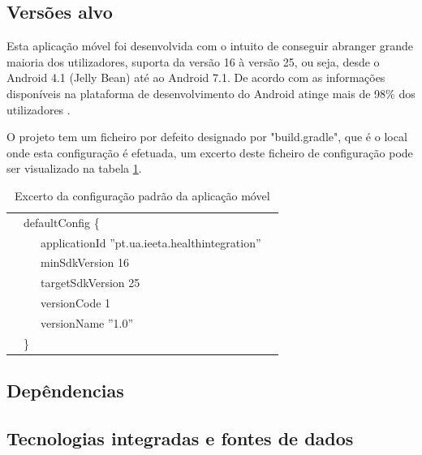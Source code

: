 \subsection{Versões alvo}
Esta aplicação móvel foi desenvolvida com o intuito de conseguir abranger grande maioria dos utilizadores, suporta da versão 16 à versão 25, ou seja,  desde o Android 4.1 (Jelly Bean) até ao Android 7.1. De acordo com as informações disponíveis na plataforma de desenvolvimento do Android atinge mais de 98\% dos utilizadores \cite{android-versions}.

O projeto tem um ficheiro por defeito designado por "build.gradle", que é o local onde esta configuração é efetuada, um excerto deste ficheiro de configuração pode ser visualizado na tabela \ref{t:defaultconfig}.


\begin{table}[H]
\centering
\begin{tabular}{llll}
\hline
 & \multicolumn{2}{l}{defaultConfig \{}                                     &  \\
 &    & applicationId {\color[HTML]{009901} ''pt.ua.ieeta.healthintegration''}                       &  \\
 &    & minSdkVersion {\color[HTML]{0767D2}16}                                                    &  \\
 &    & targetSdkVersion {\color[HTML]{0767D2}25}                                                 &  \\
 &    & versionCode {\color[HTML]{0767D2}1}                                                       &  \\
 &    & versionName {\color[HTML]{009901}''1.0''}                                                   &  \\
 & \} &                                                                     & \\
\hline
\end{tabular}
\caption[Excerto da configuração padrão da aplicação móvel]{Excerto da configuração padrão da aplicação móvel}
\label{t:defaultconfig}
\end{table}


\subsection{Depêndencias}
\subsection{Tecnologias integradas e fontes de dados}
